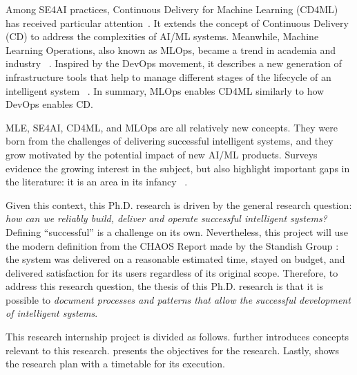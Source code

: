 Among SE4AI practices, Continuous Delivery for Machine Learning (CD4ML)
has received particular attention~\parencite{Sato2019ContinuousLearning}.
It extends the concept of Continuous Delivery (CD) to address the
complexities of AI/ML systems. Meanwhile, Machine Learning Operations,
also known as MLOps, became a trend in academia and industry%
~\parencite{Tamburri2020SustainableChallenges}. Inspired by the
DevOps movement, it describes a new generation of infrastructure tools
that help to manage different stages of the lifecycle of an intelligent system%
~\mbox{\parencite{Gift2021PracticalModels,Stenac2020IntroducingMLOps}}.
In summary, MLOps enables CD4ML similarly to how DevOps enables CD.

MLE, SE4AI, CD4ML, and MLOps are all relatively new concepts.
They were born from the challenges of delivering successful intelligent
systems, and they grow motivated by the potential impact of new AI/ML
products. Surveys evidence the growing interest in the subject, but also
highlight important gaps in the literature: it is an area in its infancy%
~\parencite{Giray2021AChallenges, Martinez-Fernandez2022SoftwareSurvey, 
Tamburri2020SustainableChallenges}.

Given this context, this Ph.D. research is driven by the general research
question: \emph{how can we reliably build, deliver and operate successful
intelligent systems?} Defining ``successful'' is a challenge on its own.
Nevertheless, this project will use the modern definition from the CHAOS
Report made by the Standish Group \parencite{Wojewoda2015CHAOS2015}:
the system was delivered on a reasonable estimated time, stayed on budget,
and delivered satisfaction for its users regardless of its original scope.
Therefore, to address this research question, the thesis of this Ph.D.
research is that it is possible to \emph{document processes and patterns
that allow the successful development of intelligent systems}.

This research internship project is divided as follows.
   further introduces concepts relevant
  to this research.
   presents the objectives for the research.
  Lastly,  shows the research plan with
  a timetable for its execution.